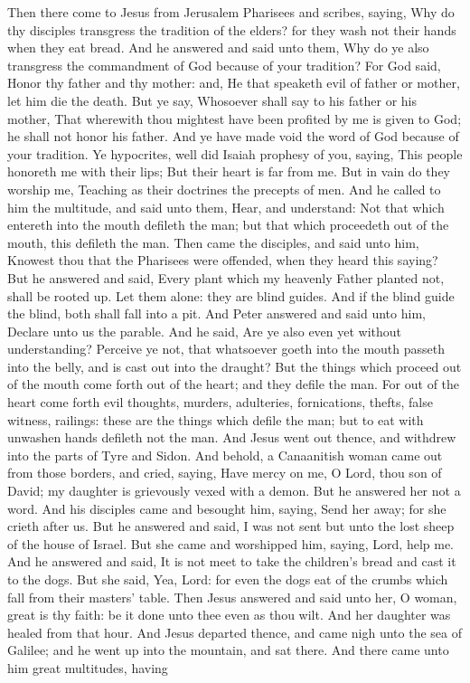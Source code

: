 Then there come to Jesus from Jerusalem Pharisees and scribes, saying, Why do thy disciples transgress the tradition of the elders? for they wash not their hands when they eat bread. And he answered and said unto them, Why do ye also transgress the commandment of God because of your tradition? For God said, Honor thy father and thy mother: and, He that speaketh evil of father or mother, let him die the death. But ye say, Whosoever shall say to his father or his mother, That wherewith thou mightest have been profited by me is given to God; he shall not honor his father. And ye have made void the word of God because of your tradition. Ye hypocrites, well did Isaiah prophesy of you, saying,  This people honoreth me with their lips; But their heart is far from me.  But in vain do they worship me, Teaching as their doctrines the precepts of men.  And he called to him the multitude, and said unto them, Hear, and understand: Not that which entereth into the mouth defileth the man; but that which proceedeth out of the mouth, this defileth the man. Then came the disciples, and said unto him, Knowest thou that the Pharisees were offended, when they heard this saying? But he answered and said, Every plant which my heavenly Father planted not, shall be rooted up. Let them alone: they are blind guides. And if the blind guide the blind, both shall fall into a pit. And Peter answered and said unto him, Declare unto us the parable. And he said, Are ye also even yet without understanding? Perceive ye not, that whatsoever goeth into the mouth passeth into the belly, and is cast out into the draught? But the things which proceed out of the mouth come forth out of the heart; and they defile the man. For out of the heart come forth evil thoughts, murders, adulteries, fornications, thefts, false witness, railings: these are the things which defile the man; but to eat with unwashen hands defileth not the man.  And Jesus went out thence, and withdrew into the parts of Tyre and Sidon. And behold, a Canaanitish woman came out from those borders, and cried, saying, Have mercy on me, O Lord, thou son of David; my daughter is grievously vexed with a demon. But he answered her not a word. And his disciples came and besought him, saying, Send her away; for she crieth after us. But he answered and said, I was not sent but unto the lost sheep of the house of Israel. But she came and worshipped him, saying, Lord, help me. And he answered and said, It is not meet to take the children’s bread and cast it to the dogs. But she said, Yea, Lord: for even the dogs eat of the crumbs which fall from their masters’ table. Then Jesus answered and said unto her, O woman, great is thy faith: be it done unto thee even as thou wilt. And her daughter was healed from that hour.  And Jesus departed thence, and came nigh unto the sea of Galilee; and he went up into the mountain, and sat there. And there came unto him great multitudes, having 
